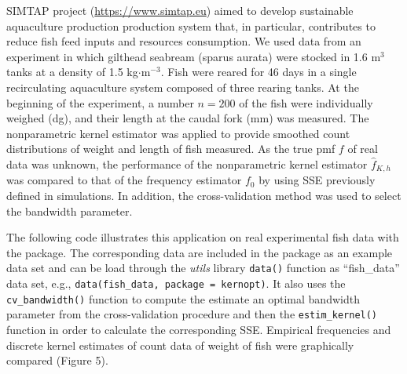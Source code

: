 SIMTAP project (\url{https://www.simtap.eu}) aimed to develop sustainable aquaculture production production system that, in particular, contributes to reduce fish feed inputs and resources consumption. We used data from an experiment in which gilthead seabream (sparus aurata) were stocked in 1.6 m\(^{3}\) tanks at a density of 1.5 kg\(\cdot\)m\(^{-3}\). Fish were reared for 46 days in a single recirculating aquaculture system composed of three rearing tanks. At the beginning of the experiment, a number \(n=200\) of the fish were individually weighed (dg), and their length at the caudal fork (mm) was measured. The nonparametric kernel estimator was applied to provide smoothed count distributions of weight and length of fish measured. As the true pmf \(f\) of real data was unknown, the performance of the nonparametric kernel estimator \(\widehat{f}_{K, h}\) was compared to that of the frequency estimator \(f_{0}\) by using SSE previously defined in simulations. In addition, the cross-validation method was used to select the bandwidth parameter.

The following code illustrates this application on real experimental fish data with the  package. The corresponding data are included in the package as an example data set and can be load through the \emph{utils} library \texttt{data()} function as ``fish\_data'' data set, e.g., \texttt{data(\textquotesingle{}fish\_data\textquotesingle{},\ package\ =\ \textquotesingle{}kernopt\textquotesingle{})}.
It also uses the  \texttt{cv\_bandwidth()} function to compute the estimate an optimal bandwidth parameter from the cross-validation procedure and then the \texttt{estim\_kernel()} function in order to calculate the corresponding SSE. Empirical frequencies and discrete kernel estimates of count data of weight of fish were graphically compared (Figure 5).

